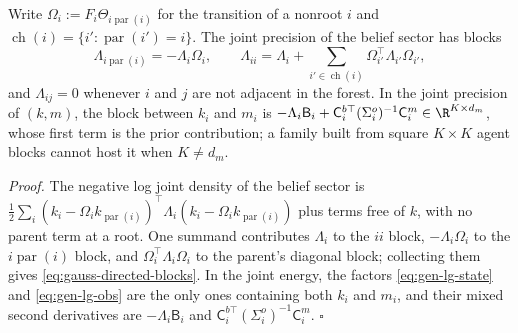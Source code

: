 Write \(\Omega_i:=F_i\Theta_{i\operatorname{par}(i)}\) for the transition of a
nonroot \(i\) and \(\operatorname{ch}(i)=\{i':\operatorname{par}(i')=i\}\). The
joint precision of the belief sector has blocks
\begin{equation}
\Lambda_{i\operatorname{par}(i)}=-\Lambda_i\Omega_i,
\qquad
\Lambda_{ii}=\Lambda_i+\sum_{i'\in\operatorname{ch}(i)}\Omega_{i'}^\top\Lambda_{i'}\Omega_{i'},
\label{eq:gauss-directed-blocks}
\end{equation}
and \(\Lambda_{ij}=0\) whenever \(i\) and \(j\) are not adjacent in the forest.
In the joint precision of \((k,m)\), the block between \(k_i\) and \(m_i\) is
\(-\Lambda_i\mathsf B_i+\mathsf C_i^{b\top}(\Sigma_i^o)^{-1}\mathsf C_i^m\in\R^{K\times d_m}\), whose
first term is the prior contribution; a family built from square
\(K\times K\) agent blocks cannot host it when \(K\neq d_m\).

\noindent\emph{Proof.}
The negative log joint density of the belief sector is
\(\tfrac12\sum_i(k_i-\Omega_ik_{\operatorname{par}(i)})^\top\Lambda_i(k_i-\Omega_ik_{\operatorname{par}(i)})\)
plus terms free of \(k\), with no parent term at a root. One summand
contributes \(\Lambda_i\) to the \(ii\) block, \(-\Lambda_i\Omega_i\) to the
\(i\operatorname{par}(i)\) block, and \(\Omega_i^\top\Lambda_i\Omega_i\) to the
parent's diagonal block; collecting them gives \eqref{eq:gauss-directed-blocks}.
In the joint energy, the factors \eqref{eq:gen-lg-state} and
\eqref{eq:gen-lg-obs} are the only ones containing both \(k_i\) and \(m_i\),
and their mixed second derivatives are \(-\Lambda_i\mathsf B_i\) and
\(\mathsf C_i^{b\top}(\Sigma_i^o)^{-1}\mathsf C_i^m\). \(\square\)


